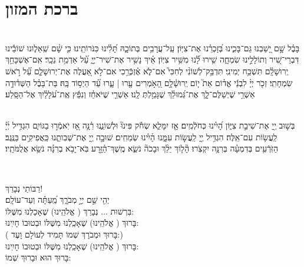 \documentclass[a4paper, twoside, openany, parskip=half, 10pt]{article}
\begin{document}

\section{ ברכת המזון }

\begin{multicols}{2}
\\
בָּבֶ֗ל שָׁ֣ם יָ֭שַׁבְנוּ גַּם־בָּכִ֑ינוּ בְּ֝זָכְרֵ֗נוּ אֶת־צִיּֽוֹן׃ 
 עַֽל־עֲרָבִ֥ים בְּתוֹכָ֑הּ תָּ֝לִ֗ינוּ כִּנֹּרוֹתֵֽינוּ׃ 
 כִּ֤י שָׁ֨ם שְֽׁאֵל֪וּנוּ שׁוֹבֵ֡ינוּ דִּבְרֵי־שִׁ֭יר וְתוֹלָלֵ֣ינוּ שִׂמְחָ֑ה שִׁ֥ירוּ לָ֝֗נוּ מִשִּׁ֥יר צִיּֽוֹן׃ 
 אֵ֗יךְ נָשִׁ֥יר אֶת־שִׁיר־יְיָ֑ עַ֝֗ל אַדְמַ֥ת נֵכָֽר׃ 
 אִֽם־אֶשְׁכָּחֵ֥ךְ יְֽרוּשָׁלִָ֗ם תִּשְׁכַּ֥ח יְמִינִֽי׃ 
 תִּדְבַּ֥ק־לְשׁוֹנִ֨י לְחִכִּי֮ אִם־לֹ֪א אֶ֫זְכְּֿרֵ֥כִי אִם־לֹ֣א אַ֭עֲלֶה אֶת־יְרוּשָׁלִַ֑ם עַ֝֗ל רֹ֣אשׁ שִׂמְחָתִֽי׃ 
 זְכֹ֤ר יְיָ֨ לִבְנֵ֬י אֱד֗וֹם אֵת֮ י֤וֹם יְֽרוּשָׁ֫לִָ֥ם הָ֭אֹ֣מְרִים עָ֤רוּ | עָ֑רוּ עַ֝֗ד הַיְס֥וֹד בָּֽהּ׃ 
 בַּת־בָּבֶ֗ל הַשְּׁד֫וּדָ֥ה אַשְׁרֵ֥י שֶׁיְשַׁלֶּם־לָ֑ךְ אֶת־גְּ֝מוּלֵ֗ךְ שֶׁגָּמַ֥לְתְּ לָֽנוּ׃ 
 אַשְׁרֵ֤י שֶׁיֹּאחֵ֓ז וְנִפֵּ֬ץ אֶֽת־עֹ֝לָלַ֗יִךְ אֶל־הַסָּֽלַע׃ 

\\
בְּשׁ֣וּב יְ֖יָ אֶת־שִׁיבַ֣ת צִיּ֑וֹן הָ֝יִ֗ינוּ כְּחֹלְֿמִֽים׃ 
 אָ֤ז יִמָּלֵ֢א שְׂחֹ֡ק פִּינוּ֘ וּלְשׁוֹנֵ֢נוּ רִ֫נָּ֥ה אָ֭ז יֹֽאמְֿר֣וּ בַגּוֹיִ֑ם הִגְדִּ֥יל יְ֜יָ֗ לַֽעֲשׂ֥וֹת עִם־אֵֽלֶּה׃ 
 הִגְדִּ֥יל יְ֖יָ לַֽעֲשׂ֣וֹת עִמָּ֑נוּ הָ֜יִ֗ינוּ שְׂמֵחִֽים׃ 
 שׁוּבָ֣ה יְ֖יָ אֶת־שְׁבִותֵ֑נוּ כַּֽאֲפִיקִ֥ים בַּנֶּֽגֶב׃ 
 הַזֹּֽרְֿעִ֥ים בְּדִמְעָ֗ה בְּרִנָּ֥ה יִקְצֹֽרוּ׃ 
 הָ֘ל֤וֹךְ יֵלֵ֨ךְ וּבָכֹה֘ נֹשֵׂ֢א מֶֽשֶׁךְ־הַ֫זָּ֥רַע בֹּֽא־יָבֹ֥א בְרִנָּ֗ה נֹשֵׂ֥א אֲלֻמֹּתָֽיו׃ 

\\
\begin{small}

רַבּוֹתַי נְבָרֵךְ!\\
 יְהִ֤י שֵׁ֣ם יְיָ֣ מְבֹרָ֑ךְ מֵֽ֝עַתָּ֗ה וְעַד־עוֹלָֽם׃\\
בִּרְשׁוּת ... נְבָרֵךְ ( אֱלֹהֵֽינוּ) שֶׁאָכַלְנוּ מִשֶּׁלּוֹ:\\
בָּרוּךְ ( אֱלֹהֵֽינוּ) שֶׁאָכַֽלְנוּ מִשֶּׁלּוֹ וּבְטוּבוֹ חָיִֽינוּ:\\
( %
בָּרוּךְ וּמְבֹרָךְ שְׁמוֹ תָּמִיד לְעוֹלָם וָעֶד:)\\
בָּרוּךְ ( אֱלֹהֵֽינוּ) שֶׁאָכַֽלְנוּ מִשֶּׁלּוֹ וּבְטוּבוֹ חָיִֽינוּ:\\ 
 בָּרוּךְ הוּא וּבָרוּךְ שְׁמוֹ:\\
\end{small}


\end{multicols}
\end{document}
